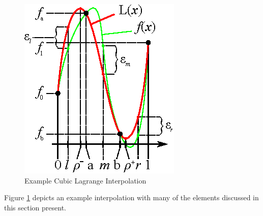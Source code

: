 \begin{figure}
  \centering
  \includegraphics{Images/CubicLagrange.eps}
  \caption[Example Cubic Lagrange Interpolation]
          {Example Cubic Lagrange Interpolation}
  \label{fig:CubicLagrange}
\end{figure}

Figure \ref{fig:CubicLagrange} depicts an example interpolation with many of the elements discussed in this section present.

